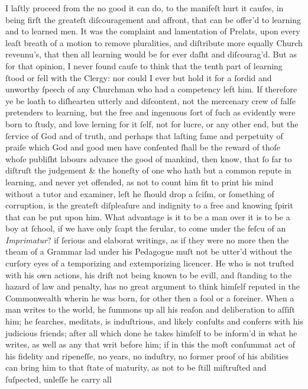 I laſtly proceed from the no good it can do, to the manifeſt hurt it cauſes, in
being firſt the greateſt diſcouragement and affront, that can be offer'd to
learning and to learned men.  It was the complaint and lamentation of Prelats,
upon every leaſt breath of a motion to remove pluralities, and diſtribute more
equally Church revennu's, that then all learning would be for ever daſht and
diſcourag'd.  But as for that opinion, I never found cauſe to think that the
tenth part of learning ſtood or fell with the Clergy: nor could I ever but hold
it for a ſordid and unworthy ſpeech of any Churchman who had a competency left
him.  If therefore ye be loath to diſhearten utterly and diſcontent, not the
mercenary crew of falſe pretenders to learning, but the free and ingenuous ſort
of ſuch as evidently were born to ſtudy, and love lerning for it ſelf, not for
lucre, or any other end, but the ſervice of God and of truth, and perhaps that
laſting fame and perpetuity of praiſe which God and good men have conſented
ſhall be the reward of thoſe whoſe publiſht labours advance the good of mankind,
then know, that ſo far to diſtruſt the judgement \& the honeſty of one who hath
but a common repute in learning, and never yet offended, as not to count him fit
to print his mind without a tutor and examiner, leſt he ſhould drop a ſciſm, or
ſomething of corruption, is the greateſt diſpleaſure and indignity to a free and
knowing ſpirit that can be put upon him.  What advantage is it to be a man over
it is to be a boy at ſchool, if we have only ſcapt the ferular, to come under
the feſcu of an \textit{Imprimatur}? if ſerious and elaborat writings, as if
they were no more then the theam of a Grammar lad under his Pedagogue muſt not
be utter'd without the curſory eyes of a temporizing and extemporizing licencer.
He who is not truſted with his own actions, his drift not being known to be
evill, and ſtanding to the hazard of law and penalty, has no great argument to
think himſelf reputed in the Commonwealth wherin he was born, for other then a
fool or a foreiner.  When a man writes to the world, he ſummons up all his
reaſon and deliberation to aſſiſt him; he ſearches, meditats, is induſtrious,
and likely conſults and conferrs with his judicious friends; after all which
done he takes himſelf to be inform'd in what he writes, as well as any that writ
before him; if in this the moſt conſummat act of his fidelity and ripeneſſe, no
years, no induſtry, no former proof of his abilities can bring him to that ſtate
of maturity, as not to be ſtill miſtruſted and ſuſpected, unleſſe he carry all
